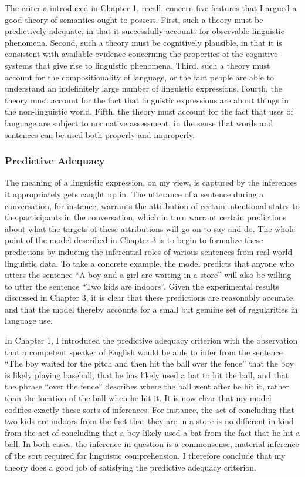 The criteria introduced in Chapter 1, recall, concern five features that I argued a good theory of semantics ought to possess. First, such a theory must be predictively adequate, in that it successfully accounts for observable linguistic phenomena. Second, such a theory must be cognitively plausible, in that it is consistent with available evidence concerning the properties of the cognitive systems that give rise to linguistic phenomena. Third, such a theory must account for the compositionality of language, or the fact people are able to understand an indefinitely large number of linguistic expressions. Fourth, the theory must account for the fact that linguistic expressions are about things in the non-linguistic world. Fifth, the theory must account for the fact that uses of language are subject to normative assessment, in the sense that words and sentences can be used both properly and improperly.

\subsubsection{Predictive Adequacy}

The meaning of a linguistic expression, on my view, is captured by the inferences it appropriately gets caught up in. The utterance of a sentence during a conversation, for instance, warrants the attribution of certain intentional states to the participants in the conversation, which in turn warrant certain predictions about what the targets of these attributions will go on to say and do. The whole point of the model described in Chapter 3 is to begin to formalize these predictions by inducing the inferential roles of various sentences from real-world linguistic data. To take a concrete example, the model predicts that anyone who utters the sentence ``A boy and a girl are waiting in a store'' will also be willing to utter the sentence ``Two kids are indoors''. Given the experimental results discussed in Chapter 3, it is clear that these predictions are reasonably accurate, and that the model thereby accounts for a small but genuine set of regularities in language use. 

In Chapter 1, I introduced the predictive adequacy criterion with the observation that a competent speaker of English would be able to infer from the sentence ``The boy waited for the pitch and then hit the ball over the fence'' that the boy is likely playing baseball, that he has likely used a bat to hit the ball, and that the phrase ``over the fence'' describes where the ball went after he hit it, rather than the location of the ball when he hit it. It is now clear that my model codifies exactly these sorts of inferences. For instance, the act of concluding that two kids are indoors from the fact that they are in a store is no different in kind from the act of concluding that a boy likely used a bat from the fact that he hit a ball. In both cases, the inference in question is a commonsense, material inference of the sort required for linguistic comprehension. I therefore conclude that my theory does a good job of satisfying the predictive adequacy criterion. 

